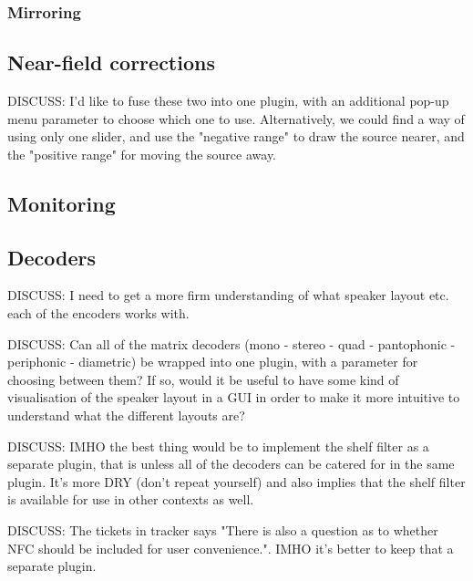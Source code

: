 \documentclass{article}
\begin{document}
\subsubsection{Mirroring}\label{sec:mirror}





\subsection{Near-field corrections}\label{sec:near-field}

DISCUSS: I'd like to fuse these two into one plugin, with an additional pop-up menu parameter to choose which one to use. Alternatively, we could find a way of using only one slider, and use the "negative range" to draw the source nearer, and the "positive range" for moving the source away.




\subsection{Monitoring}\label{sec:monitors}





\subsection{Decoders}\label{sec:decoders}

DISCUSS: I need to get a more firm understanding of what speaker layout etc. each of the encoders works with.

DISCUSS: Can all of the matrix decoders (mono - stereo - quad - pantophonic - periphonic - diametric) be wrapped into one plugin, with a parameter for choosing between them? If so, would it be useful to have some kind of visualisation of the speaker layout in a GUI in order to make it more intuitive to understand what the different layouts are?

DISCUSS: IMHO the best thing would be to implement the shelf filter as a separate plugin, that is unless all of the decoders can be catered for in the same plugin. It's more DRY (don't repeat yourself) and also implies that the shelf filter is available for use in other contexts as well.

DISCUSS: The tickets in tracker says "There is also a question as to whether NFC should be included for user convenience.". IMHO it's better to keep that a separate plugin.
\end{document}
